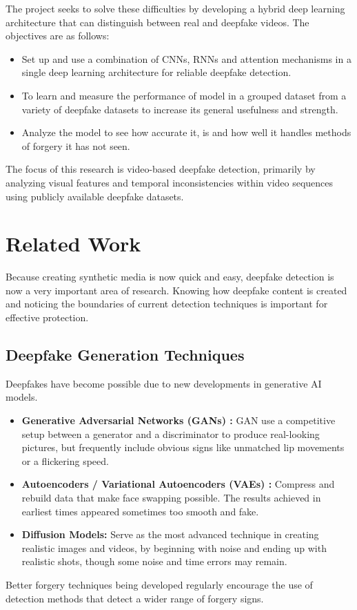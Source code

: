 \documentclass[conference]{IEEEtran}
\begin{document}
The project seeks to solve these difficulties by developing a hybrid deep learning architecture that can distinguish between real and deepfake videos. The objectives are as follows:
\begin{itemize}
   \item  Set up and use a combination of CNNs, RNNs and attention mechanisms in a single deep learning architecture for reliable deepfake detection.
   \item   To learn and measure the performance of model in a grouped dataset from a variety of deepfake datasets to increase its general usefulness and strength.
   \item   Analyze the model to see how accurate it, is and how well it handles methods of forgery it has not seen.
\end{itemize}
The focus of this research is video-based deepfake detection, primarily by analyzing visual features and temporal inconsistencies within video sequences using publicly available deepfake datasets.

\section{Related Work}
Because creating synthetic media is now quick and easy, deepfake detection is now a very important area of research. Knowing how deepfake content is created and noticing the boundaries of current detection techniques is important for effective protection.

\subsection{Deepfake Generation Techniques}
Deepfakes have become possible due to new developments in generative AI models.
\begin{itemize}
\item \textbf{Generative Adversarial Networks (GANs) :} GAN use a competitive setup between a generator and a discriminator to produce real-looking pictures, but frequently include obvious signs like unmatched lip movements or a flickering speed.
\item \textbf{Autoencoders / Variational Autoencoders (VAEs) :} Compress and rebuild data that make face swapping possible. The results achieved in earliest times appeared sometimes too smooth and fake.
\item \textbf{Diffusion Models:} Serve as the most advanced technique in creating realistic images and videos, by beginning with noise and ending up with realistic shots, though some noise and time errors may remain.
\end{itemize}
Better forgery techniques being developed regularly encourage the use of detection methods that detect a wider range of forgery signs.
\end{document}
